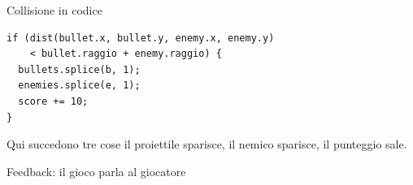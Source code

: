 \documentclass[aspectratio=169]{beamer}
\newcommand{\player}[2]{
  \begin{scope}[shift={(#1,#2)}]
    \draw[fill=Green, draw=white, line width=1.2pt] (0,0) circle (0.32);
    \draw[white, line width=2.2pt, -{Latex[length=3mm]}] (0,0) -- (0.62,0);
    \fill[Ink!70] (0.12,0.1) circle (0.04);
  \end{scope}
}
\newcommand{\enemy}[2]{
  \begin{scope}[shift={(#1,#2)}]
    \draw[fill=Red, draw=white, line width=1pt] (0,0) circle (0.26);
    \fill[Ink!60] (0.08,0.08) circle (0.04);
  \end{scope}
}
\newcommand{\shot}[2]{
  \fill[Yellow] (#1,#2) circle (0.08);
}
\begin{document}
\begin{frame}[fragile]{Collisione in codice}
  \begin{lstlisting}[style=jsstyle]
if (dist(bullet.x, bullet.y, enemy.x, enemy.y)
    < bullet.raggio + enemy.raggio) {
  bullets.splice(b, 1);
  enemies.splice(e, 1);
  score += 10;
}
  \end{lstlisting}
  \begin{block}{Qui succedono tre cose}
    il proiettile sparisce, il nemico sparisce, il punteggio sale.
  \end{block}
\end{frame}

\begin{frame}{Feedback: il gioco parla al giocatore}
\end{frame}
\end{document}
